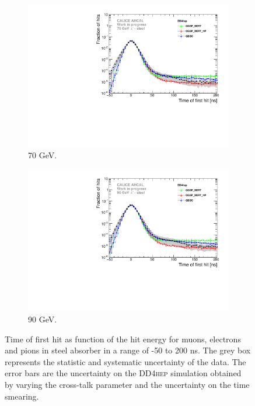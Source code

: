 \documentclass{JINST}
\newcommand\ddhep{\textsc{DD4hep}\xspace}
\begin{document}
\begin{figure}[htbp!]
\begin{subfigure}[t]{0.49\textwidth}
    \includegraphics[width=1\textwidth]{fig/Comparison_SimData_Pion70GeV_LateClusters_DD4hep.pdf}
    \caption{70 GeV.} \label{fig:dNdt_SimData_70GeV_DD4hep}
  \end{subfigure}
  \hfill
  \begin{subfigure}[t]{0.49\textwidth}
    \centering
    \includegraphics[width=1\textwidth]{fig/Comparison_SimData_Pion90GeV_LateClusters_DD4hep.pdf}
    \caption{90 GeV.} \label{fig:dNdt_SimData_90GeV_DD4hep}
  \end{subfigure}
  \caption{Time of first hit as function of the hit energy for muons, electrons and pions in steel absorber in a range of -50 to 200 ns. The grey box represents the statistic and systematic uncertainty of the data. The error bars are the uncertainty on the \ddhep simulation obtained by varying the cross-talk parameter and the uncertainty on the time smearing.}
\end{figure}
\end{document}

